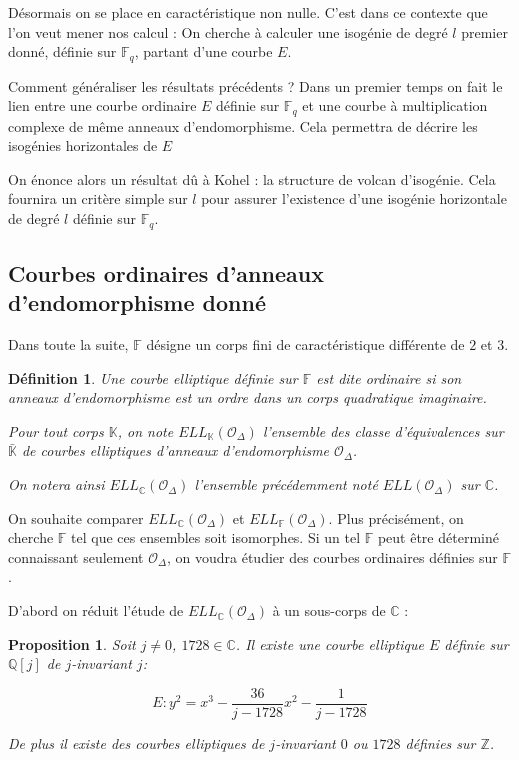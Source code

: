 \documentclass{article}
\newcommand{\Z}[0]{\mathbb{Z}}
\newcommand{\Q}[0]{\mathbb{Q}}
\newcommand{\C}[0]{\mathbb{C}}
\newcommand{\K}[0]{\mathbb{K}}
\newcommand{\Kb}[0]{\bar{\K}}
\newcommand{\OR}[0]{\mathcal{O}}
\newcommand{\F}[0]{\mathbb{F}}
\newtheorem{Prop}[The]{Proposition}
\newtheorem{Def}[The]{Définition}
\begin{document}
Désormais on se place en caractéristique non nulle. C'est dans ce contexte que l'on veut mener nos calcul : On cherche à calculer une isogénie de degré $l$ premier donné, définie sur $\F_{q}$, partant d'une courbe $E$. 

Comment généraliser les résultats précédents ? Dans un premier temps on fait le lien entre une courbe ordinaire $E$ définie sur $\F_{q}$ et une courbe à multiplication complexe de même anneaux d'endomorphisme. Cela permettra de décrire les isogénies horizontales de $E$

On énonce alors un résultat dû à Kohel : la structure de volcan d'isogénie. Cela fournira un critère simple sur $l$ pour assurer l'existence d'une isogénie horizontale de degré $l$ définie sur $\F_{q}$.  










\subsection{Courbes ordinaires d'anneaux d'endomorphisme donné}

Dans toute la suite, $\F$ désigne un corps fini de caractéristique différente de $2$ et $3$.

\begin{Def}
	Une courbe elliptique définie sur $\F$ est dite ordinaire si son anneaux d'endomorphisme est un ordre dans un corps quadratique imaginaire. 
	
	Pour tout corps $\K$, on note $ELL_{\K}(\OR_{\Delta})$ l'ensemble des classe d'équivalences sur $\Kb$ de courbes elliptiques d'anneaux d'endomorphisme $\OR_{\Delta}$.
	
	On notera ainsi $ELL_{\C}(\OR_{\Delta})$ l'ensemble précédemment noté $ELL(\OR_{\Delta})$ sur $\C$. 
\end{Def}

On souhaite comparer $ELL_{\C}(\OR_{\Delta})$ et $ELL_{\F}(\OR_{\Delta})$. Plus précisément, on cherche $\F$ tel que ces ensembles soit isomorphes. Si un tel $\F$ peut être déterminé connaissant seulement $\OR_{\Delta}$, on voudra étudier des courbes ordinaires définies sur $\F$. 

D'abord on réduit l'étude de $ELL_{\C}(\OR_{\Delta})$ à un sous-corps de $\C$ :

\begin{Prop}
	Soit $j\neq 0$, $1728\in\C$. Il existe une courbe elliptique $E$ définie sur $\Q[j]$ de $j$-invariant $j$:
	
	\begin{equation*}
		E : y^2 = x^3 - \frac{36}{j - 1728}x^2 - \frac{1}{j - 1728}
	\end{equation*}
	
	De plus il existe des courbes elliptiques de $j$-invariant $0$ ou $1728$ définies sur $\Z$.
	
\end{Prop}
\end{document}
